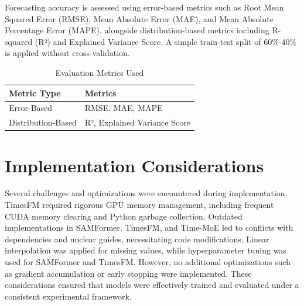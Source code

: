Forecasting accuracy is assessed using error-based metrics such as Root Mean Squared Error (RMSE), Mean Absolute Error (MAE), and Mean Absolute Percentage Error (MAPE), alongside distribution-based metrics including R-squared (R²) and Explained Variance Score. A simple train-test split of 60\%-40\% is applied without cross-validation.

\begin{table}[ht]
\centering
\caption{Evaluation Metrics Used}
\begin{tabular}{|p{4cm}|p{8cm}|}
\hline
\textbf{Metric Type} & \textbf{Metrics} \\
\hline
Error-Based & RMSE, MAE, MAPE \\
\hline
Distribution-Based & R², Explained Variance Score \\
\hline
\end{tabular}
\label{tab:evaluation_metrics}
\end{table}

\section{Implementation Considerations}

Several challenges and optimizations were encountered during implementation. TimesFM required rigorous GPU memory management, including frequent CUDA memory clearing and Python garbage collection. Outdated implementations in SAMFormer, TimesFM, and Time-MoE led to conflicts with dependencies and unclear guides, necessitating code modifications. Linear interpolation was applied for missing values, while hyperparameter tuning was used for SAMFormer and TimesFM. However, no additional optimizations such as gradient accumulation or early stopping were implemented. These considerations ensured that models were effectively trained and evaluated under a consistent experimental framework.